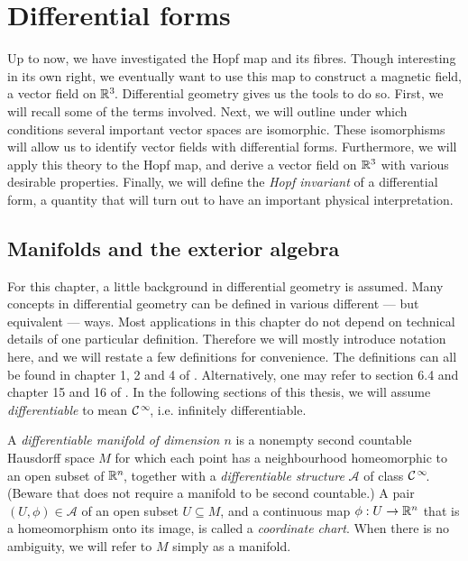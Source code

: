 
\newcommand*{\poincares}{Poincaré\kern0.4pt ’\kern 0.1pt s\xspace}

\chapter{Differential forms}
\label{chap:differential-forms}
Up to now, we have investigated the Hopf map and its fibres.
Though interesting in its own right,
we eventually want to use this map to construct a magnetic field,
a vector field on $\mathbb{R}^3\!$.
Differential geometry gives us the tools to do so.
First, we will recall some of the terms involved.
Next, we will outline under which conditions several important vector spaces are isomorphic.
These isomorphisms will allow us to identify vector fields with differential forms.
Furthermore, we will apply this theory to the Hopf map,
and derive a vector field on $\mathbb{R}^3$ with various desirable properties.
Finally, we will define the \emph{Hopf invariant} of a differential form,
a quantity that will turn out to have an important physical interpretation.

\section{Manifolds and the exterior algebra}
For this chapter,
a little background in differential geometry is assumed.
Many concepts in differential geometry can be defined in various different
— but equivalent — ways.
Most applications in this chapter do not depend
on technical details of one particular definition.
Therefore we will mostly introduce notation here,
and we will restate a few definitions for convenience.
The definitions can all be found in chapter 1, 2 and 4 of \parencite{warner1971}.
Alternatively,
one may refer to section 6.4 and chapter 15 and 16 of \parencite{szekeres2004}.
In the following sections of this thesis,
we will assume \emph{differentiable} to mean $\mathcal{C}^{\hspace{1pt}\infty}\!$, i.e. infinitely differentiable.

A \emph{differentiable manifold of dimension $n$} is
a nonempty second countable Hausdorff space $M$
for which each point has a neighbourhood homeomorphic to an open subset of $\mathbb{R}^n\!$,
together with a \emph{differentiable structure} $\mathcal{A}$ of class $\mathcal{C}^{\hspace{1pt}\infty}\!$.
(Beware that \parencite{szekeres2004} does not require a manifold to be second countable.)
A pair $(U, \phi) \in \mathcal{A}$ of an open subset $U \subseteq M$,
and a continuous map $\phi : U \to \mathbb{R}^n$ that is a homeomorphism onto its image,
is called a \emph{coordinate chart}.
When there is no ambiguity,
we will refer to $M$ simply as a manifold.

